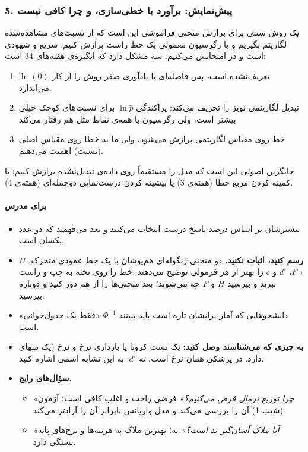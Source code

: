 \subsubsection{5. پیش‌نمایش: برآورد با خطی‌سازی، و چرا کافی نیست}

یک روش سنتی برای برازش منحنی فراموشی این است که از نسبت‌های مشاهده‌شده
لگاریتم بگیریم و با رگرسیون معمولی یک خط راست برازش کنیم. سریع و شهودی
است و در  امتحانش می‌کنیم. سه مشکل دارد که انگیزه‌ی هفته‌های 3\lr{--}4
است:

\begin{enumerate}
\def\labelenumi{\arabic{enumi}.}
\tightlist
\item
  \(\ln(0)\) تعریف‌نشده است، پس فاصله‌ای با یادآوری صفر روش را از کار
  می‌اندازد.
\item
  تبدیل لگاریتمی نویز را تحریف می‌کند: پراکندگی \(\ln \hat p\) برای
  نسبت‌های کوچک خیلی بیشتر است، ولی رگرسیون با همه‌ی نقاط مثل هم رفتار
  می‌کند.
\item
  خط روی مقیاس لگاریتمی برازش می‌شود، ولی ما به خطا روی مقیاس اصلی (نسبت)
  اهمیت می‌دهیم.
\end{enumerate}

جایگزین اصولی این است که مدل را مستقیماً روی داده‌ی تبدیل‌نشده برازش کنیم:
با کمینه کردن مربع خطا (هفته‌ی 3) یا بیشینه کردن درست‌نمایی دوجمله‌ای
(هفته‌ی 4).

\paragraph{برای مدرس}

\begin{itemize}
\tightlist
\item
  بیشترشان بر اساس درصد پاسخ درست انتخاب می‌کنند و بعد می‌فهمند که دو عدد
  یکسان است.
\item
  \textbf{رسم کنید، اثبات نکنید.} دو منحنی زنگوله‌ای هم‌پوشان با یک خط
  عمودی متحرک، \(H\)، \(F\)، \(d'\) و \(c\) را بهتر از هر فرمولی توضیح
  می‌دهند. خط را روی تخته به چپ و راست ببرید و بپرسید \(H\) و \(F\) چه
  می‌شوند؛ بعد منحنی‌ها را از هم دور کنید و دوباره بپرسید.
\item
  دانشجوهایی که آمار برایشان تازه است باید ببینند \(\Phi^{-1}\) «فقط یک
  جدول‌خوانی» است.
\item
  \textbf{به چیزی که می‌شناسند وصل کنید:} یک تست کرونا یا بارداری نرخ
   و نرخ  (یک منهای
   دارد.  در پزشکی همان نرخ 
  است، \emph{نه} \(d'\): به این تشابه اسمی اشاره کنید.
\item
  \textbf{سؤال‌های رایج.}

  \begin{itemize}
  \tightlist
  \item
    \emph{«چرا توزیع نرمال فرض می‌کنیم؟»} فرضی راحت و اغلب کافی است؛
    آزمون  (شیب 1) آن را بررسی می‌کند و مدل واریانس نابرابر آن
    را آزادتر می‌کند.
  \item
    \emph{«آیا ملاک آسان‌گیر بد است؟»} نه؛ بهترین ملاک به هزینه‌ها و
    نرخ‌های پایه بستگی دارد.
  \end{itemize}
\end{itemize}


